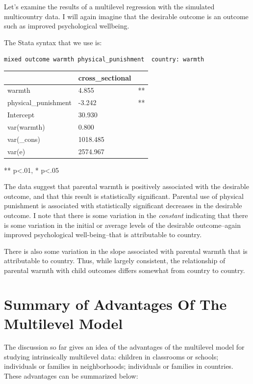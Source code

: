 \documentclass[
  letterpaper,
  DIV=11,
  numbers=noendperiod]{scrreprt}
\begin{document}
Let's examine the results of a multilevel regression with the simulated
multicountry data. I will again imagine that the desirable outcome is an
outcome such as improved psychological wellbeing.

The Stata syntax that we use is:

\texttt{mixed\ outcome\ warmth\ physical\_punishment\ \textbar{}\textbar{}\ country:\ warmth}

\begin{longtable}[]{@{}lll@{}}
\toprule()
& cross\_sectional & \\
\midrule()
\endhead
warmth & 4.855 & ** \\
physical\_punishment & -3.242 & ** \\
Intercept & 30.930 & \\
var(warmth) & 0.800 & \\
var(\_cons) & 1018.485 & \\
var(e) & 2574.967 & \\
\bottomrule()
\end{longtable}

** p\textless.01, * p\textless.05

The data suggest that parental warmth is positively associated with the
desirable outcome, and that this result is statistically significant.
Parental use of physical punishment is associated with statistically
significant decreases in the desirable outcome. I note that there is
some variation in the \emph{constant} indicating that there is some
variation in the initial or average levels of the desirable
outcome--again improved psychological well-being--that is attributable
to country.

There is also some variation in the slope associated with parental
warmth that is attributable to country. Thus, while largely consistent,
the relationship of parental warmth with child outcomes differs somewhat
from country to country.

\hypertarget{summary-of-advantages-of-the-multilevel-model}{%
\section{Summary of Advantages Of The Multilevel
Model}\label{summary-of-advantages-of-the-multilevel-model}}

The discussion so far gives an idea of the advantages of the multilevel
model for studying intrinsically multilevel data: children in classrooms
or schools; individuals or families in neighborhoods; individuals or
families in countries. These advantages can be summarized below:
\end{document}
